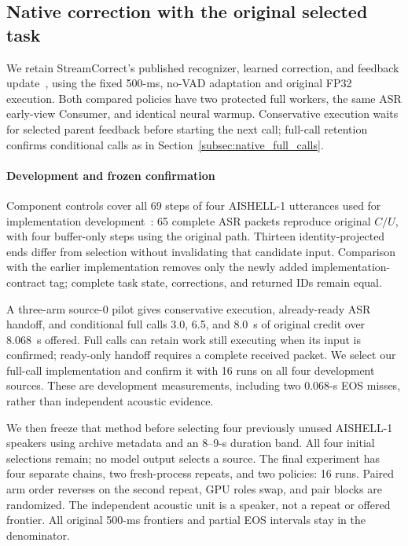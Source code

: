 \subsection{Native correction with the original selected task}
\label{subsec:native_retention_eval}
We retain StreamCorrect's published recognizer, learned correction, and
feedback update~\cite{vu2026streamcorrect}, using the fixed 500-ms, no-VAD
adaptation and original FP32 execution. Both compared policies have two
protected full workers, the same ASR early-view Consumer, and identical
neural warmup. Conservative execution waits for selected parent feedback
before starting the next call; full-call retention confirms conditional
calls as in Section~\ref{subsec:native_full_calls}.

\paragraph{Development and frozen confirmation}
Component controls cover all 69 steps of four AISHELL-1 utterances used
for implementation development~\cite{bu2017aishell}: 65 complete ASR
packets reproduce original $C/U$, with four buffer-only steps using the
original path. Thirteen identity-projected ends differ from selection
without invalidating that candidate input. Comparison with the earlier
implementation removes only the newly added implementation-contract tag;
complete task state, corrections, and returned IDs remain equal.

A three-arm source-0 pilot gives conservative execution, already-ready
ASR handoff, and conditional full calls 3.0, 6.5, and 8.0~s of original
credit over 8.068~s offered. Full calls can retain work still executing
when its input is confirmed; ready-only handoff requires a complete
received packet. We select our full-call implementation and confirm it
with 16 runs on all four development sources. These are development
measurements, including two 0.068-s EOS misses, rather than independent
acoustic evidence.

We then freeze that method before selecting four previously unused
AISHELL-1 speakers using archive metadata and an 8--9-s duration band.
All four initial selections remain; no model output selects a source.
The final experiment has four separate chains, two fresh-process repeats,
and two policies: 16 runs. Paired arm order reverses on the second repeat,
GPU roles swap, and pair blocks are randomized. The independent acoustic
unit is a speaker, not a repeat or offered frontier. All original
500-ms frontiers and partial EOS intervals stay in the denominator.

